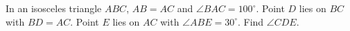 In an isosceles triangle $ABC$, $AB=AC$ and $\angle BAC=100^\circ$. Point $D$ lies on $BC$ with $BD=AC$. Point $E$ lies on $AC$ with $\angle ABE=30^\circ$. Find $\angle CDE$.
